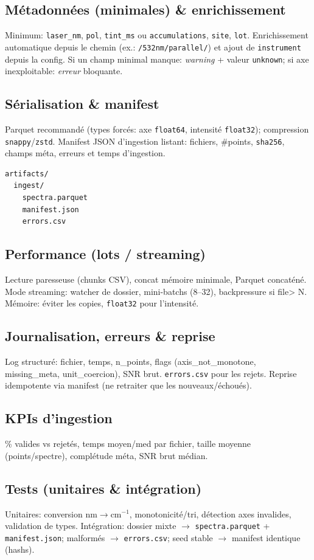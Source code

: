 \subsection{Métadonnées (minimales) \& enrichissement}
Minimum: \texttt{laser\_nm}, \texttt{pol}, \texttt{tint\_ms} ou \texttt{accumulations}, \texttt{site}, \texttt{lot}. Enrichissement automatique depuis le chemin (ex.: \texttt{/532nm/parallel/}) et ajout de \texttt{instrument} depuis la config. Si un champ minimal manque: \textit{warning} + valeur \texttt{unknown}; si axe inexploitable: \textit{erreur} bloquante.

\subsection{Sérialisation \& manifest}
Parquet recommandé (types forcés: axe \texttt{float64}, intensité \texttt{float32}); compression \texttt{snappy}/\texttt{zstd}. Manifest JSON d'ingestion listant: fichiers, \#points, \texttt{sha256}, champs méta, erreurs et temps d'ingestion.
\begin{verbatim}
artifacts/
  ingest/
    spectra.parquet
    manifest.json
    errors.csv
\end{verbatim}

\subsection{Performance (lots / streaming)}
Lecture paresseuse (chunks CSV), concat mémoire minimale, Parquet concaténé. Mode streaming: watcher de dossier, mini-batchs (8–32), backpressure si file> N. Mémoire: éviter les copies, \texttt{float32} pour l'intensité.

\subsection{Journalisation, erreurs \& reprise}
Log structuré: fichier, temps, n_points, flags (axis\_not\_monotone, missing\_meta, unit\_coercion), SNR brut. \texttt{errors.csv} pour les rejets. Reprise idempotente via manifest (ne retraiter que les nouveaux/échoués).

\subsection{KPIs d'ingestion}
\% valides vs rejetés, temps moyen/med par fichier, taille moyenne (points/spectre), complétude méta, SNR brut médian.

\subsection{Tests (unitaires \& intégration)}
Unitaires: conversion nm$\rightarrow$cm$^{-1}$, monotonicité/tri, détection axes invalides, validation de types.
Intégration: dossier mixte $\rightarrow$ \texttt{spectra.parquet} + \texttt{manifest.json}; malformés $\rightarrow$ \texttt{errors.csv}; seed stable $\rightarrow$ manifest identique (hashs).

